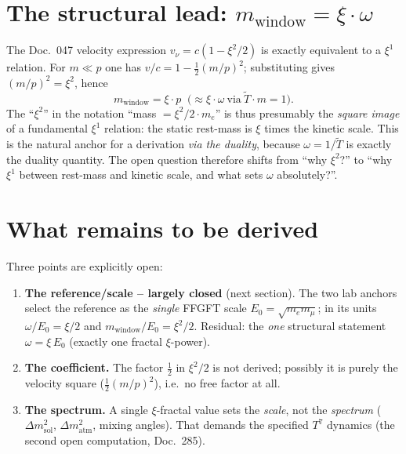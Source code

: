 \section{The structural lead: $m_{\text{window}}=\xi\cdot\omega$}
The Doc.~047 velocity expression $v_\nu=c(1-\xi^2/2)$ is exactly equivalent to a $\xi^1$ relation.
For $m\ll p$ one has $v/c=1-\tfrac12(m/p)^2$; substituting gives $(m/p)^2=\xi^2$, hence
\begin{equation}
m_{\text{window}}=\xi\cdot p\;\;\big(\approx \xi\cdot\omega\ \text{via}\ \tilde T\cdot m=1\big).
\end{equation}
The \enquote{$\xi^2$} in the notation \enquote{mass $=\xi^2/2\cdot m_e$} is thus presumably the
\emph{square image} of a fundamental $\xi^1$ relation: the static rest-mass is $\xi$ times the
kinetic scale. This is the natural anchor for a derivation \emph{via the duality}, because
$\omega=1/\tilde T$ is exactly the duality quantity. The open question therefore shifts from
\enquote{why $\xi^2$?} to \enquote{why $\xi^1$ between rest-mass and kinetic scale, and what sets
$\omega$ absolutely?}.

\section{What remains to be derived}
Three points are explicitly open:
\begin{enumerate}
  \item \textbf{The reference/scale -- largely closed} (next section). The two lab anchors select the
  reference as the \emph{single} FFGFT scale $E_0=\sqrt{m_e m_\mu}$; in its units $\omega/E_0=\xi/2$
  and $m_{\text{window}}/E_0=\xi^2/2$. Residual: the \emph{one} structural statement $\omega=\xi\,E_0$
  (exactly one fractal $\xi$-power).
  \item \textbf{The coefficient.} The factor $\tfrac12$ in $\xi^2/2$ is not derived; possibly it is
  purely the velocity square ($\tfrac12(m/p)^2$), i.e.\ no free factor at all.
  \item \textbf{The spectrum.} A single $\xi$-fractal value sets the \emph{scale}, not the
  \emph{spectrum} ($\Delta m^2_{\text{sol}}$, $\Delta m^2_{\text{atm}}$, mixing angles). That demands
  the specified $T^7$ dynamics (the second open computation, Doc.~285).
\end{enumerate}

